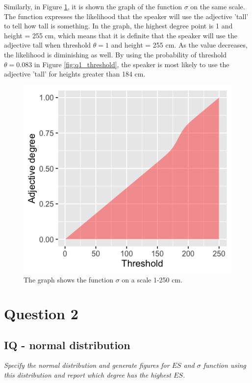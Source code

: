\documentclass[11pt,a4paper,oneside]{article}
\begin{document}
Similarly, in Figure \ref{fig:q1_sigma}, it is shown the graph of the function $\sigma$ on the same scale. The function expresses the likelihood that the speaker will use the adjective 'tall' to tell how tall is something. In the graph, the highest degree point is 1 and height = 255 cm, which means that it is definite that the speaker will use the adjective tall when threshold $ \theta = 1$ and height = 255 cm. As the value decreases, the likelihood is diminishing as well. By using the probability of threshold $\theta = 0.083$ in Figure \ref{fig:q1_threshold}, the speaker is most likely to use the adjective 'tall' for heights greater than 184 cm.

\begin{figure}[H]
    \centering
    \includegraphics[width=\textwidth]{figs/Question_1_sigma.png}
    \caption{The graph shows the function $\sigma$ on a scale 1-250 cm.}
  \label{fig:q1_sigma}
\end{figure}



\section{Question 2}
\label{Q2}
\subsection{IQ - normal distribution}
\textit{Specify the normal distribution and generate figures for $ES$ and $\sigma$ function using this distribution and report which degree has the highest $ES$.}\\
\end{document}

